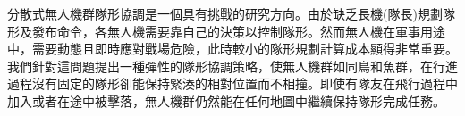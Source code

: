 
分散式無人機群隊形協調是一個具有挑戰的研究方向。由於缺乏長機(隊長)規劃隊形及發布命令，各無人機需要靠自己的決策以控制隊形。然而無人機在軍事用途中，需要動態且即時應對戰場危險，此時較小的隊形規劃計算成本顯得非常重要。我們針對這問題提出一種彈性的隊形協調策略，使無人機群如同鳥和魚群，在行進過程沒有固定的隊形卻能保持緊湊的相對位置而不相撞。即使有隊友在飛行過程中加入或者在途中被擊落，無人機群仍然能在任何地圖中繼續保持隊形完成任務。
\clearpage